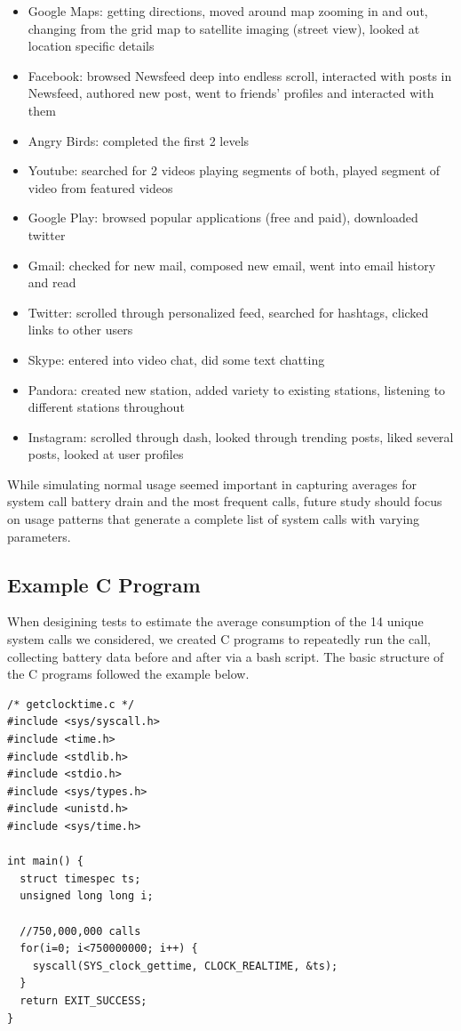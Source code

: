 \documentclass[11pt]{article}
\begin{document}
\begin{itemize}
  \item Google Maps: getting directions, moved around map zooming in and out, changing from the grid map
  to satellite imaging (street view), looked at location specific details 
  \item Facebook: browsed Newsfeed deep into endless scroll, interacted with posts in Newsfeed, authored
  new post, went to friends' profiles and interacted with them
  \item Angry Birds: completed the first 2 levels
  \item Youtube: searched for 2 videos playing segments of both, played segment of video from featured videos
  \item Google Play: browsed popular applications (free and paid), downloaded twitter
  \item Gmail: checked for new mail, composed new email, went into email history and read 
  \item Twitter: scrolled through personalized feed, searched for hashtags, clicked links to other users 
  \item Skype: entered into video chat, did some text chatting 
  \item Pandora: created new station, added variety to existing stations, listening to different stations
  throughout
  \item Instagram: scrolled through dash, looked through trending posts, liked several posts, looked at 
  user profiles
\end{itemize}

While simulating normal usage seemed important in capturing averages for system call battery drain and the most
frequent calls, future study should focus on usage patterns that generate a complete list of system calls with 
varying parameters.

\subsection{Example C Program}

When desigining tests to estimate the average consumption of the 14 unique system calls we considered,
we created C programs to repeatedly run the call, collecting battery data before and after via a bash script.
The basic structure of the C programs followed the example below.

\begin{lstlisting}
/* getclocktime.c */
#include <sys/syscall.h>
#include <time.h>
#include <stdlib.h>
#include <stdio.h>
#include <sys/types.h>
#include <unistd.h>
#include <sys/time.h>

int main() {
  struct timespec ts;
  unsigned long long i;

  //750,000,000 calls
  for(i=0; i<750000000; i++) {
    syscall(SYS_clock_gettime, CLOCK_REALTIME, &ts);
  }
  return EXIT_SUCCESS;
}
\end{lstlisting}
\end{document}
